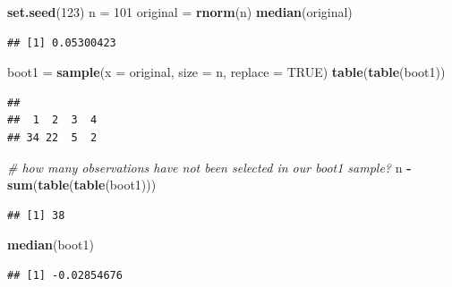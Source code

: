 \documentclass[10pt,ignorenonframetext,]{beamer}
\newenvironment{Shaded}{\begin{snugshade}}{\end{snugshade}}
\newcommand{\KeywordTok}[1]{\textcolor[rgb]{0.13,0.29,0.53}{\textbf{#1}}}
\newcommand{\DataTypeTok}[1]{\textcolor[rgb]{0.13,0.29,0.53}{#1}}
\newcommand{\DecValTok}[1]{\textcolor[rgb]{0.00,0.00,0.81}{#1}}
\newcommand{\StringTok}[1]{\textcolor[rgb]{0.31,0.60,0.02}{#1}}
\newcommand{\CommentTok}[1]{\textcolor[rgb]{0.56,0.35,0.01}{\textit{#1}}}
\newcommand{\OtherTok}[1]{\textcolor[rgb]{0.56,0.35,0.01}{#1}}
\newcommand{\OperatorTok}[1]{\textcolor[rgb]{0.81,0.36,0.00}{\textbf{#1}}}
\newcommand{\NormalTok}[1]{#1}
\begin{document}
\begin{frame}[fragile]

\begin{Shaded}
\begin{Highlighting}[]
\KeywordTok{set.seed}\NormalTok{(}\DecValTok{123}\NormalTok{)}
\NormalTok{n =}\StringTok{ }\DecValTok{101}
\NormalTok{original =}\StringTok{ }\KeywordTok{rnorm}\NormalTok{(n)}
\KeywordTok{median}\NormalTok{(original)}
\end{Highlighting}
\end{Shaded}

\begin{verbatim}
## [1] 0.05300423
\end{verbatim}

\begin{Shaded}
\begin{Highlighting}[]
\NormalTok{boot1 =}\StringTok{ }\KeywordTok{sample}\NormalTok{(}\DataTypeTok{x =}\NormalTok{ original, }\DataTypeTok{size =}\NormalTok{ n, }\DataTypeTok{replace =} \OtherTok{TRUE}\NormalTok{)}
\KeywordTok{table}\NormalTok{(}\KeywordTok{table}\NormalTok{(boot1))}
\end{Highlighting}
\end{Shaded}

\begin{verbatim}
## 
##  1  2  3  4 
## 34 22  5  2
\end{verbatim}

\begin{Shaded}
\begin{Highlighting}[]
\CommentTok{# how many observations have not been selected in our boot1 sample?}
\NormalTok{n }\OperatorTok{-}\StringTok{ }\KeywordTok{sum}\NormalTok{(}\KeywordTok{table}\NormalTok{(}\KeywordTok{table}\NormalTok{(boot1)))}
\end{Highlighting}
\end{Shaded}

\begin{verbatim}
## [1] 38
\end{verbatim}

\begin{Shaded}
\begin{Highlighting}[]
\KeywordTok{median}\NormalTok{(boot1)}
\end{Highlighting}
\end{Shaded}

\begin{verbatim}
## [1] -0.02854676
\end{verbatim}

\end{frame}
\end{document}
